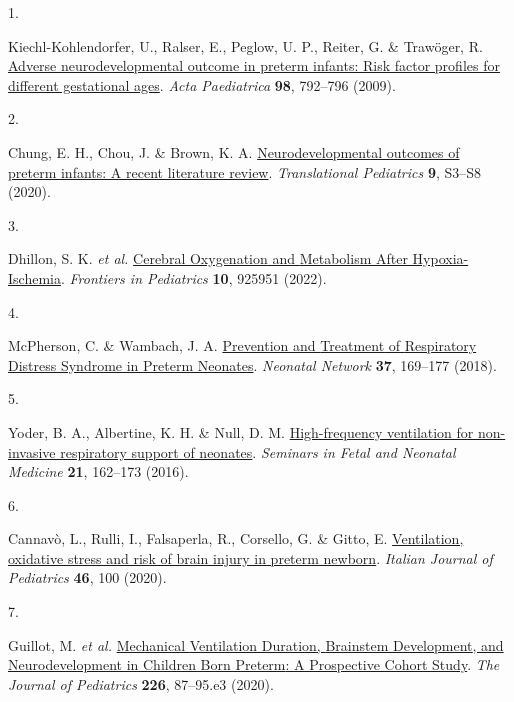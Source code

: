 \documentclass[
  letterpaper,
  DIV=11,
  numbers=noendperiod]{scrartcl}
\newlength{\cslhangindent}
\newlength{\csllabelwidth}
\newenvironment{CSLReferences}[2] %
 {\begin{list}{}{%
  \setlength{\itemindent}{0pt}
  \setlength{\leftmargin}{0pt}
  \setlength{\parsep}{0pt}
  \ifodd #1
   \setlength{\leftmargin}{\cslhangindent}
   \setlength{\itemindent}{-1\cslhangindent}
  \fi
  \setlength{\itemsep}{#2\baselineskip}}}
 {\end{list}}
\newcommand{\CSLLeftMargin}[1]{\parbox[t]{\csllabelwidth}{\strut#1\strut}}
\newcommand{\CSLRightInline}[1]{\parbox[t]{\linewidth - \csllabelwidth}{\strut#1\strut}}
\begin{document}
\label{refs}
\begin{CSLReferences}{0}{0}
\CSLLeftMargin{1. }%
\CSLRightInline{Kiechl-Kohlendorfer, U., Ralser, E., Peglow, U. P.,
Reiter, G. \& Trawöger, R.
\href{https://doi.org/10.1111/j.1651-2227.2009.01219.x}{Adverse
neurodevelopmental outcome in preterm infants: Risk factor profiles for
different gestational ages}. \emph{Acta Paediatrica} \textbf{98},
792--796 (2009).}

\CSLLeftMargin{2. }%
\CSLRightInline{Chung, E. H., Chou, J. \& Brown, K. A.
\href{https://doi.org/10.21037/tp.2019.09.10}{Neurodevelopmental
outcomes of preterm infants: A recent literature review}.
\emph{Translational Pediatrics} \textbf{9}, S3--S8 (2020).}

\CSLLeftMargin{3. }%
\CSLRightInline{Dhillon, S. K. \emph{et al.}
\href{https://doi.org/10.3389/fped.2022.925951}{Cerebral {Oxygenation}
and {Metabolism After Hypoxia-Ischemia}}. \emph{Frontiers in Pediatrics}
\textbf{10}, 925951 (2022).}

\CSLLeftMargin{4. }%
\CSLRightInline{McPherson, C. \& Wambach, J. A.
\href{https://doi.org/10.1891/0730-0832.37.3.169}{Prevention and
{Treatment} of {Respiratory Distress Syndrome} in {Preterm Neonates}}.
\emph{Neonatal Network} \textbf{37}, 169--177 (2018).}

\CSLLeftMargin{5. }%
\CSLRightInline{Yoder, B. A., Albertine, K. H. \& Null, D. M.
\href{https://doi.org/10.1016/j.siny.2016.02.001}{High-frequency
ventilation for non-invasive respiratory support of neonates}.
\emph{Seminars in Fetal and Neonatal Medicine} \textbf{21}, 162--173
(2016).}

\CSLLeftMargin{6. }%
\CSLRightInline{Cannavò, L., Rulli, I., Falsaperla, R., Corsello, G. \&
Gitto, E. \href{https://doi.org/10.1186/s13052-020-00852-1}{Ventilation,
oxidative stress and risk of brain injury in preterm newborn}.
\emph{Italian Journal of Pediatrics} \textbf{46}, 100 (2020).}

\CSLLeftMargin{7. }%
\CSLRightInline{Guillot, M. \emph{et al.}
\href{https://doi.org/10.1016/j.jpeds.2020.05.039}{Mechanical
{Ventilation Duration}, {Brainstem Development}, and {Neurodevelopment}
in {Children Born Preterm}: {A Prospective Cohort Study}}. \emph{The
Journal of Pediatrics} \textbf{226}, 87--95.e3 (2020).}


\end{CSLReferences}
\end{document}
